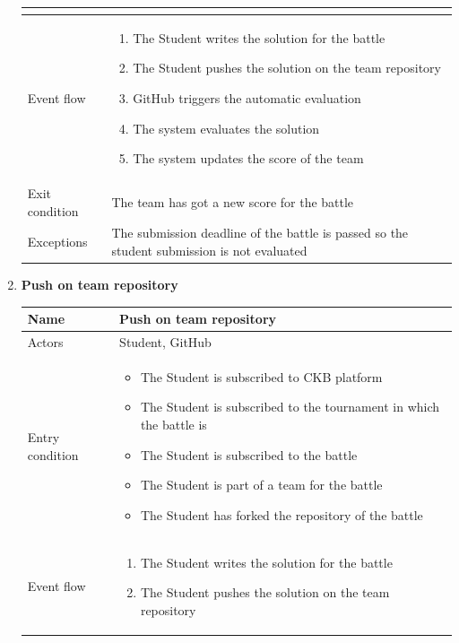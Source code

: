 \begin{enumerate}[label=UC\arabic*:]
\begin{tabular}{|p{3cm}|p{8cm}|}
\begin{itemize}
        \end{itemize} \\
        \hline
        Event flow &
        \begin{enumerate}[label=\arabic*.]
            \item The Student writes the solution for the battle
            \item The Student pushes the solution on the team repository
            \item GitHub triggers the automatic evaluation
            \item The system evaluates the solution
            \item The system updates the score of the team
        \end{enumerate} \\
        \hline
        Exit condition & The team has got a new score for the battle \\
        \hline
        Exceptions & The submission deadline of the battle is passed so the student submission is not evaluated \\
        \hline
    \end{tabular}
    \item \textbf{Push on team repository} \\
    \begin{tabular}{|p{3cm}|p{8cm}|}
        \hline
        Name & Push on team repository \\
        \hline
        Actors & Student, GitHub \\
        \hline
        Entry condition &
        \begin{itemize}
            \item The Student is subscribed to CKB platform
            \item The Student is subscribed to the tournament in which the battle is
            \item The Student is subscribed to the battle
            \item The Student is part of a team for the battle
            \item The Student has forked the repository of the battle
        \end{itemize} \\
        \hline
        Event flow &
        \begin{enumerate}[label=\arabic*.]
            \item The Student writes the solution for the battle
            \item The Student pushes the solution on the team repository

\end{enumerate}
\end{tabular}
\end{enumerate}

